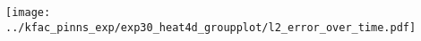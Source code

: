 \documentclass[a0paper]{tikzposter}
\begin{document}
\begin{columns}
{\begin{minipage}[t]{0.28\linewidth}
      \texttt{[image: ../kfac\_pinns\_exp/exp30\_heat4d\_groupplot/l2\_error\_over\_time.pdf]}
    \end{minipage}
    \hfill

    \vspace{-0.5ex}
  }
\end{columns}
\end{document}
